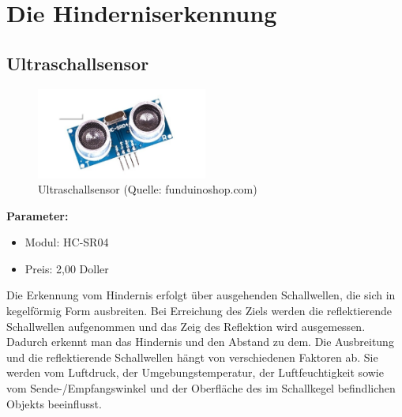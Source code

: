 \renewcommand{\autoren}{Valentyn Chepil}
\newpage
\section{Die Hinderniserkennung}
\subsection{Ultraschallsensor}

\begin{figure}[!h]  %
	\centering\includegraphics[width=0.5\textwidth]{images/Bild-1-1.png}
	\caption{Ultraschallsensor \newline(Quelle: funduinoshop.com)}
	\label{bild_1.1} %
\end{figure}

\textbf{Parameter:}  %
\begin{itemize} 
	\item Modul: HC-SR04 
	\item Preis:  2,00 Doller
\end{itemize}

Die Erkennung vom Hindernis erfolgt über ausgehenden Schallwellen, die sich in kegelförmig Form  ausbreiten. Bei Erreichung des Ziels werden die reflektierende Schallwellen aufgenommen und das Zeig des Reflektion wird ausgemessen. Dadurch erkennt man das Hindernis und den Abstand zu dem. Die Ausbreitung und die reflektierende Schallwellen hängt von verschiedenen Faktoren ab. Sie werden vom Luftdruck, der Umgebungstemperatur, der Luftfeuchtigkeit sowie vom Sende-/Empfangswinkel und der Oberfläche des im Schallkegel befindlichen Objekts
beeinflusst.

